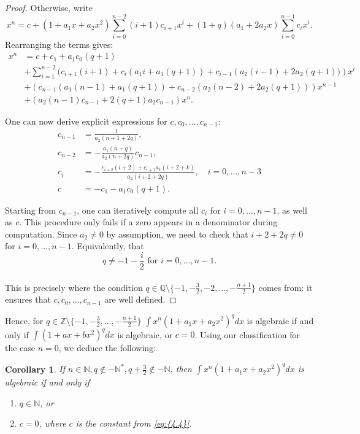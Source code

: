 \documentclass[11pt]{article}
\theoremstyle{definition}
\theoremstyle{plain}
\newtheorem{cor}[defi]{Corollary}
\theoremstyle{remark}
\begin{document}
\begin{enumerate}
\begin{proof}
Otherwise, write
\[x^n = c + (1+a_1x+a_2x^2)\sum\limits_{i=0}^{n-2}(i+1)c_{i+1}x^{i} + (1+q)(a_1+2a_2x)\sum\limits_{i=0}^{n-1}c_ix^i.\]
Rearranging the terms gives:
\begin{align*}
x^n &= c + c_1 + a_1c_0(q+1)  \\
&+ \sum\limits_{i=1}^{n-2} (c_{i+1}(i+1) + c_i \left(a_1i + a_1(q+1)\right) + c_{i-1} \left(a_2(i-1) + 2a_2(q+1))\right)x^i \label{4.6}\tag{4.6}\\
&+ (c_{n-1}\left(a_1(n-1)+a_1(q+1)\right)+c_{n-2}\left(a_2(n-2) + 2a_2(q+1)\right))x^{n-1} \\
& + (a_2(n-1)c_{n-1}+2(q+1)a_2c_{n-1})x^n.
\end{align*}


One can now derive explicit expressions for $c,c_0,\ldots,c_{n-1}$:
\begin{align*}
c_{n-1} &= \frac{1}{a_2(n+1+2q)}, \\
c_{n-2} &= -\frac{a_1(n+q)}{a_2(n+2q)}c_{n-1}, \\
c_{i} &= -\frac{c_{i+2}(i+2) + c_{i+1}a_1\left(i + 2 + k\right)}{a_2(i + 2 + 2q)}, \quad i=0,\ldots,n-3 \\
c &= -c_1 - a_1c_0(q+1).
\end{align*}

Starting from $c_{n-1}$, one can iteratively compute all $c_i$ for $i=0,\ldots,n-1$, as well as $c$. This procedure only fails if a zero appears in a denominator during computation. Since $a_2 \neq 0$ by assumption, we need to check that $i + 2 + 2q \neq 0$ for $i=0,\ldots,n-1$. Equivalently, that
\[q \neq -1 - \frac{i}{2} \text{ for } i = 0,\ldots,n-1.\]
\\
This is precisely where the condition $q\in\mathbb{Q}\setminus\{-1,-\frac{3}{2},-2,\ldots,-\frac{n+1}{2}\}$ comes from: it ensures that $c, c_0, \ldots, c_{n-1}$ are well defined.
\end{proof}
Hence, for $q \in \mathbb{Z}\setminus\{-1,-\frac{3}{2},\ldots,-\frac{n+1}{2}\}$ $\int{x^n (1+a_1x+a_2x^2)^q dx}$ is algebraic if and only if $\int{(1+ax+bx^2)^qdx}$ is algebraic, or $c = 0$. Using our classification for the case $n=0$, we deduce the following: 
\begin{cor}\label{cor6.1}
If $n \in \mathbb{N}, q\notin -\mathbb{N}^*, q+\frac{3}{2}\notin -\mathbb{N}$, then $\int{x^n (1+a_1x+a_2x^2)^q dx}$ is algebraic if and only if 
\begin{enumerate}
\item $q\in\mathbb{N}$, or
\item $c = 0$, where $c$ is the constant from \eqref{eq:{4.4}}.
\end{enumerate}
\end{cor}


\end{enumerate}
\end{document}
